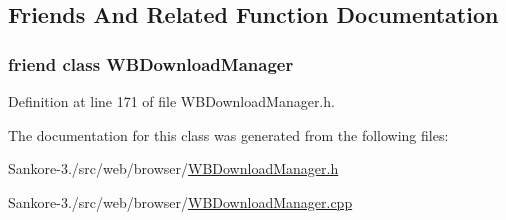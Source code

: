 \subsection{Friends And Related Function Documentation}
\hypertarget{class_w_b_download_model_a51953c82a69006744cca1a7f922e0a26}{
\subsubsection[{W\-B\-Download\-Manager}]{\setlength{\rightskip}{0pt plus 5cm}friend class {\bf W\-B\-Download\-Manager}\hspace{0.3cm}{\ttfamily [friend]}}}\label{db/d9e/class_w_b_download_model_a51953c82a69006744cca1a7f922e0a26}


Definition at line 171 of file W\-B\-Download\-Manager.\-h.



The documentation for this class was generated from the following files\-:\begin{DoxyCompactItemize}
\item 
Sankore-\/3./src/web/browser/\hyperlink{_w_b_download_manager_8h}{W\-B\-Download\-Manager.\-h}\item 
Sankore-\/3./src/web/browser/\hyperlink{_w_b_download_manager_8cpp}{W\-B\-Download\-Manager.\-cpp}\end{DoxyCompactItemize}
